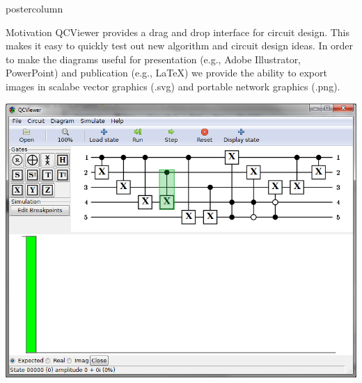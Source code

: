 \documentclass[final]{beamer} %
\begin{document}
\begin{frame}{}
\begin{columns}
\begin{column}{.33\textwidth}
\begin{beamercolorbox}[center,wd=\textwidth]{postercolumn}
\begin{minipage}[c][0.95\textheight][s]{0.95\columnwidth}
\begin{block}{\large Motivation}
                QCViewer provides a drag and drop interface for circuit design. 
                This makes it easy to quickly test out new algorithm and circuit design ideas. 
                In order to make the diagrams useful for presentation (e.g., Adobe Illustrator, PowerPoint) and publication (e.g., \LaTeX) we provide the ability to export images in scalabe vector graphics (.svg) and portable network graphics (.png).
                \begin{center} 
                    \includegraphics{figures/Motivation.png}
                \end{center}
            \end{block}
        \end{minipage}
        \end{beamercolorbox}
        \end{column}


\end{columns}
\end{frame}
\end{document}
